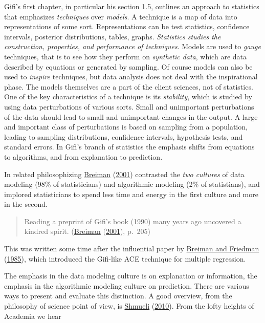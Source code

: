 \documentclass[
  12pt,
]{book}
\begin{document}
Gifi's first chapter, in particular his section 1.5, outlines an approach to statistics that emphasizes \emph{techniques} over \emph{models}. A technique is a map of data into representations of some sort. Representations can be test statistics, confidence intervals, posterior distributions, tables, graphs. \emph{Statistics studies the construction, properties, and performance of techniques}. Models are used to \emph{gauge} techniques, that is to see how they perform on \emph{synthetic data}, which are data described by equations or generated by sampling. Of course models can also be used to \emph{inspire} techniques, but data analysis does not deal with the inspirational phase. The models themselves are a part of the client sciences, not of statistics. One of the key characteristics of a technique is its \emph{stability}, which is studied by using data perturbations of various sorts. Small and unimportant perturbations of the data should lead to small and unimportant changes in the output. A large and
important class of perturbations is based on sampling from a population, leading to sampling distributions, confidence intervals, hypothesis tests, and standard errors. In Gifi's branch of statistics the emphasis shifts from equations to algorithms, and from explanation to prediction.

In related philosophizing \protect\hyperlink{ref-breiman_01}{Breiman} (\protect\hyperlink{ref-breiman_01}{2001}) contrasted the \emph{two cultures} of data modeling (98\% of statisticians) and algorithmic modeling (2\% of statistians), and implored statisticians to spend less time and energy in the first culture and more in the second.

\begin{quote}
Reading a preprint of Gifi's book (1990) many years ago uncovered a kindred spirit.
(\protect\hyperlink{ref-breiman_01}{Breiman} (\protect\hyperlink{ref-breiman_01}{2001}), p.~205)
\end{quote}

This was written some time after the influential paper by \protect\hyperlink{ref-breiman_friedman_85}{Breiman and Friedman} (\protect\hyperlink{ref-breiman_friedman_85}{1985}), which introduced the Gifi-like ACE technique for multiple regression.

The emphasis in the data modeling culture is on explanation or information, the emphasis in the algorithmic modeling culture on prediction. There are various ways to present and evaluate this distinction. A good overview, from the philosophy of science point of view, is \protect\hyperlink{ref-shmueli_10}{Shmueli} (\protect\hyperlink{ref-shmueli_10}{2010}). From the lofty heights of Academia we hear
\end{document}
